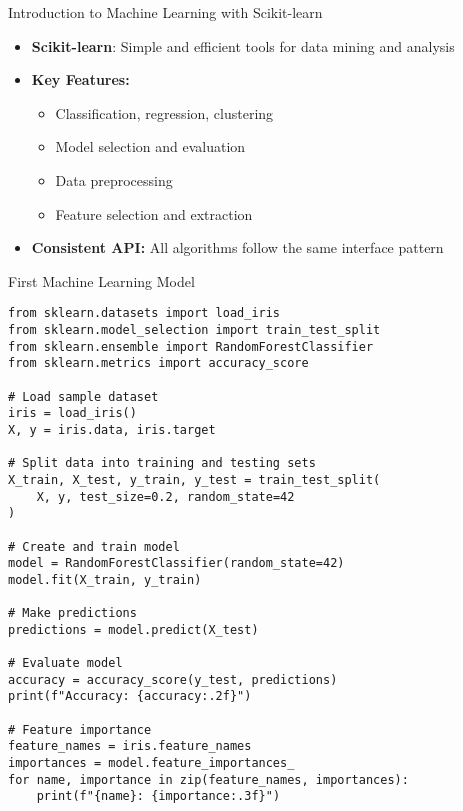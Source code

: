 \begin{frame}{Introduction to Machine Learning with Scikit-learn}
    \begin{itemize}
        \item \textbf{Scikit-learn}: Simple and efficient tools for data mining and analysis
        \item \textbf{Key Features:}
        \begin{itemize}
            \item Classification, regression, clustering
            \item Model selection and evaluation
            \item Data preprocessing
            \item Feature selection and extraction
        \end{itemize}
        \item \textbf{Consistent API:} All algorithms follow the same interface pattern
    \end{itemize}
\end{frame}

\begin{frame}[fragile]{First Machine Learning Model}
    \begin{codeblock}
        \begin{lstlisting}
from sklearn.datasets import load_iris
from sklearn.model_selection import train_test_split
from sklearn.ensemble import RandomForestClassifier
from sklearn.metrics import accuracy_score

# Load sample dataset
iris = load_iris()
X, y = iris.data, iris.target

# Split data into training and testing sets
X_train, X_test, y_train, y_test = train_test_split(
    X, y, test_size=0.2, random_state=42
)

# Create and train model
model = RandomForestClassifier(random_state=42)
model.fit(X_train, y_train)

# Make predictions
predictions = model.predict(X_test)

# Evaluate model
accuracy = accuracy_score(y_test, predictions)
print(f"Accuracy: {accuracy:.2f}")

# Feature importance
feature_names = iris.feature_names
importances = model.feature_importances_
for name, importance in zip(feature_names, importances):
    print(f"{name}: {importance:.3f}")
        \end{lstlisting}
    \end{codeblock}
\end{frame}
